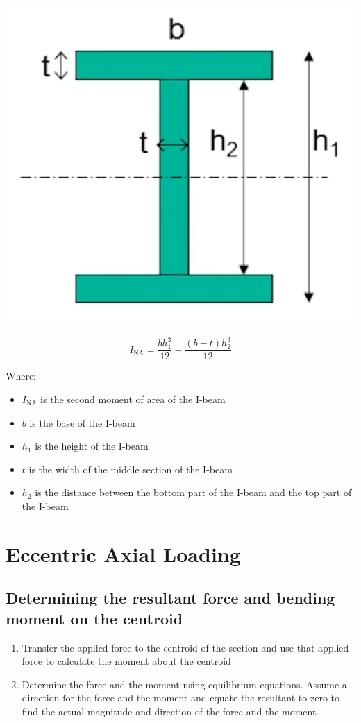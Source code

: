 \documentclass[11pt]{article}
\begin{document}
\begin{center}
\includegraphics[scale=1]{./images/i-beam-section-moment-of-inertia.png}
\end{center}

\[I_{\text{NA}} = \frac{bh_1^3}{12} - \frac{(b - t)h_2^3}{12}\]

Where:
\begin{itemize}
\item \(I_{\text{NA}}\) is the second moment of area of the I-beam
\item \(b\) is the base of the I-beam
\item \(h_1\) is the height of the I-beam
\item \(t\) is the width of the middle section of the I-beam
\item \(h_2\) is the distance between the bottom part of the I-beam and the top part of the I-beam
\end{itemize}


\section{Eccentric Axial Loading}
\label{sec:org468b371}

\subsection{Determining the resultant force and bending moment on the centroid}
\label{sec:orgaeb3f7a}
\begin{enumerate}
\item Transfer the applied force to the centroid of the section and use that applied force to calculate the moment about the centroid
\item Determine the force and the moment using equilibrium equations. Assume a direction for the force and the moment and equate the resultant to zero to find the actual magnitude and direction of the force and the moment.
\end{enumerate}
\end{document}

